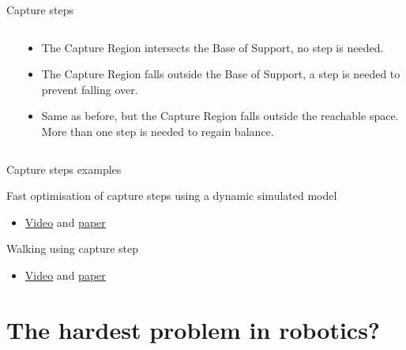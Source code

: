 \documentclass[compress]{beamer}
\begin{document}
\begin{frame}{Capture steps}
{\begin{columns}
\begin{column}{0.5\linewidth}
\begin{center}
            \end{center}
        \end{column}
        \begin{column}{0.5\linewidth}
    \begin{itemize}

        \item The Capture Region intersects the Base of Support, no step is needed.
        \item The Capture Region falls outside the Base of Support, a step is needed
            to prevent falling over.
        \item Same as before, but the Capture Region falls outside the reachable
            space. More than one step is needed to regain balance.
    \end{itemize}
        \end{column}
    \end{columns}
    }

\end{frame}


\begin{frame}{Capture steps examples}

    Fast optimisation of capture steps using a dynamic simulated model

    \begin{itemize}

        \item \href{http://spectrum.ieee.org/automaton/robotics/humanoids/japanese-high-power-humanoid-robot-hrp3l-jsk}{Video}
            and
            \href{http://ieeexplore.ieee.org/xpl/login.jsp?tp=\&arnumber=6100894\&url=http://ieeexplore.ieee.org/xpls/icp.jsp?arnumber\%3D6100894}{paper}
    \end{itemize}

    Walking using capture step

    \begin{itemize}

        \item \href{http://www.ais.uni-bonn.de/movies/WalkingWithCaptureSteps.wmv}{Video}
            and
            \href{http://www.ais.uni-bonn.de/papers/RoboCup_2014_Missura_Capture_Steps.pdf}{paper}
    \end{itemize}

\end{frame}

\section{The hardest problem in robotics?}
\end{document}
